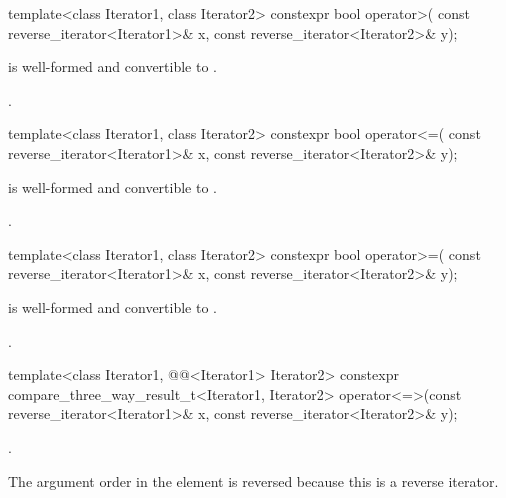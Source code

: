 %
\begin{itemdecl}
template<class Iterator1, class Iterator2>
  constexpr bool operator>(
    const reverse_iterator<Iterator1>& x,
    const reverse_iterator<Iterator2>& y);
\end{itemdecl}

\begin{itemdescr}
\pnum
\constraints
{} is well-formed and
convertible to .

\pnum
\returns
{}.
\end{itemdescr}

%
\begin{itemdecl}
template<class Iterator1, class Iterator2>
  constexpr bool operator<=(
    const reverse_iterator<Iterator1>& x,
    const reverse_iterator<Iterator2>& y);
\end{itemdecl}

\begin{itemdescr}
\pnum
\constraints
{} is well-formed and
convertible to .

\pnum
\returns
{}.
\end{itemdescr}

%
\begin{itemdecl}
template<class Iterator1, class Iterator2>
  constexpr bool operator>=(
    const reverse_iterator<Iterator1>& x,
    const reverse_iterator<Iterator2>& y);
\end{itemdecl}

\begin{itemdescr}
\pnum
\constraints
{} is well-formed and
convertible to .

\pnum
\returns
{}.
\end{itemdescr}

%
\begin{itemdecl}
template<class Iterator1, @@<Iterator1> Iterator2>
  constexpr compare_three_way_result_t<Iterator1, Iterator2>
    operator<=>(const reverse_iterator<Iterator1>& x,
                const reverse_iterator<Iterator2>& y);
\end{itemdecl}

\begin{itemdescr}
\pnum
\returns
{}.

\pnum
\begin{note}
The argument order in the \returns element is reversed
because this is a reverse iterator.
\end{note}
\end{itemdescr}


